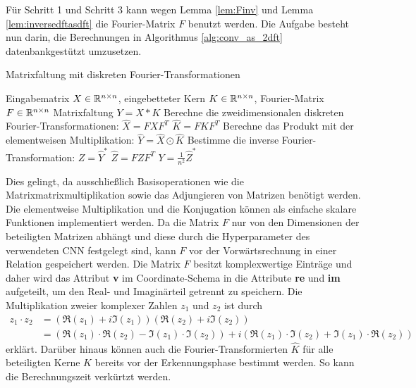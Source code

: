 Für Schritt 1 und Schritt 3 kann wegen Lemma \ref{lem:Finv} und Lemma \ref{lem:inversedftasdft} die Fourier-Matrix $F$ benutzt werden. Die Aufgabe besteht nun darin, die Berechnungen in Algorithmus \ref{alg:conv_as_2dft} datenbankgestützt umzusetzen. 
\begin{algorithm}[h]
    \caption{Matrixfaltung mit diskreten Fourier-Transformationen}
    \label{alg:conv_as_2dft}
    \begin{algorithmic}
    \Require  Eingabematrix $X \in \mathbb{R}^{n \times n}$, eingebetteter Kern $K \in \mathbb{R}^{n \times n}$, Fourier-Matrix $F \in \mathbb{R}^{n \times n}$ 
    \Ensure Matrixfaltung $Y= X \ast K$
    \State Berechne die zweidimensionalen diskreten Fourier-Transformationen:
    \State $\hat{X}=F X F^T$
    \State $\hat{K}=F K F^T$ 
    \State Berechne das Produkt mit der elementweisen Multiplikation:
    \State $\hat{Y}= \hat{X} \odot \hat{K}$
    \State Bestimme die inverse Fourier-Transformation:  
    \State $Z=\hat{Y}^*$
    \State $\hat{Z}=F Z F^T$
    \State $Y=\frac{1}{n^2}\hat{Z}^*$
    \end{algorithmic}
\end{algorithm}

Dies gelingt, da ausschließlich Basisoperationen wie die Matrixmatrixmultiplikation sowie das Adjungieren von Matrizen benötigt werden. Die elementweise Multiplikation und die Konjugation können als einfache skalare Funktionen implementiert werden. Da die Matrix $F$ nur von den Dimensionen der beteiligten Matrizen abhängt und diese durch die Hyperparameter des verwendeten CNN festgelegt sind, kann $F$ vor der Vorwärtsrechnung in einer Relation gespeichert werden. 
Die Matrix $F$ besitzt komplexwertige Einträge und daher wird das Attribut \textbf{v} im Coordinate-Schema in die Attribute \textbf{re} und \textbf{im} aufgeteilt, um den Real- und Imaginärteil getrennt zu speichern. Die Multiplikation zweier komplexer Zahlen $z_1$ und $z_2$ ist durch
\begin{align*}
    z_1 \cdot z_2 &=(\Re(z_1)+ i \Im(z_1))(\Re(z_2)+i \Im(z_2))\\
    &=(\Re(z_1) \cdot \Re(z_2)-\Im(z_1) \cdot \Im(z_2))+ i (\Re(z_1) \cdot \Im(z_2)+ \Im(z_1) \cdot \Re(z_2))
\end{align*}
erklärt.
Darüber hinaus können auch die Fourier-Transformierten $\hat{K}$ für alle beteiligten Kerne $K$ bereits vor der Erkennungsphase bestimmt werden. So kann die Berechnungszeit verkürtzt werden.


